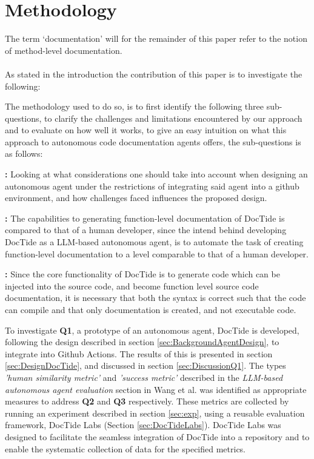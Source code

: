 \newcommand\itemb{\item[\textbf{Q2:}]}
\newcommand\itemc{\item[\textbf{Q3:}]}

\section{Methodology}
\label{sec:method}
The term `documentation' will for the remainder of this paper refer to the notion of method-level documentation.
\\ \\
As stated in the introduction the contribution of this paper is to investigate the following:
\begin{quote}
    \researchQuestion
\end{quote}
The methodology used to do so, is to first identify the following three sub-questions, to clarify the challenges and limitations encountered by our approach and to evaluate on how well it works, to give an easy intuition on what this approach to autonomous code documentation agents offers, the sub-questions is as follows:

\begin{qlist}
    \item \subquestionI\textbf{:}
    Looking at what considerations one should take into account when designing an autonomous agent under the restrictions of integrating said agent into a github environment, and how challenges faced influences the proposed design.
    \itemb \subquestionII\textbf{:}
    The capabilities to generating function-level documentation of DocTide is compared to that of a human developer, since the intend behind developing DocTide as a LLM-based autonomous agent, is to automate the task of creating function-level documentation to a level comparable to that of a human developer.
    \itemc \subquestionIII\textbf{:}
    Since the core functionality of DocTide is to generate code which can be injected into the source code, and become function level source code documentation, it is necessary that both the syntax is correct such that the code can compile and that only documentation is created, and not executable code.
\end{qlist}


To investigate \textbf{Q1}, a prototype of an autonomous agent, DocTide is developed, following the design described in section \ref{sec:BackgroundAgentDesign}, to integrate into Github Actions. The results of this is presented in section \ref{sec:DesignDocTide}, and discussed in section \ref{sec:DiscussionQ1}. The types \textit{'human similarity metric'} and \textit{'success metric'} described in the \textit{LLM-based autonomous agent evaluation} section in Wang et al.\cite{wang2024survey} was identified as appropriate measures to address \textbf{Q2} and \textbf{Q3} respectively. These metrics are collected by running an experiment described in section \ref{sec:exp}, using a reusable evaluation framework, DocTide Labs (Section \ref{sec:DocTideLabs}). DocTide Labs was designed to facilitate the seamless integration of DocTide into a repository and to enable the systematic collection of data for the specified metrics.

